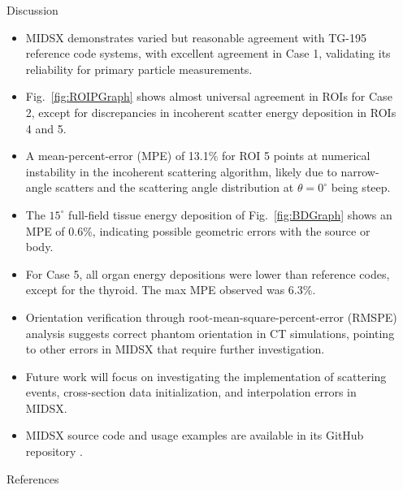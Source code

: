 \documentclass[final]{beamer}
\newlength{\sepwidth}
\newlength{\colwidth}
\newcommand{\separatorcolumn}{\begin{column}{\sepwidth}\end{column}}
\begin{document}
\begin{frame}[t]
\begin{columns}[t]
\begin{column}{\colwidth}
\begin{block}{Discussion}
  \begin{itemize}
      \item MIDSX demonstrates varied but reasonable agreement with TG-195 reference code systems, with excellent agreement in Case 1, validating its reliability for primary particle measurements.
      \item Fig.~\ref{fig:ROIPGraph} shows almost universal agreement in ROIs for Case 2, except for discrepancies in incoherent scatter energy deposition in ROIs 4 and 5.
      \item A mean-percent-error (MPE) of 13.1\% for ROI 5 points at numerical instability in the incoherent scattering algorithm, likely due to narrow-angle scatters and the scattering angle distribution at $\theta = 0^\circ$ being steep.
      \item The $15^\circ$ full-field tissue energy deposition of Fig.~\ref{fig:BDGraph} shows an MPE of 0.6\%, indicating possible geometric errors with the source or body.
      \item For Case 5, all organ energy depositions were lower than reference codes, except for the thyroid. The max MPE observed was 6.3\%.
      \item Orientation verification through root-mean-square-percent-error (RMSPE) analysis suggests correct phantom orientation in CT simulations, pointing to other errors in MIDSX that require further investigation.
      \item Future work will focus on investigating the implementation of scattering events, cross-section data initialization, and interpolation errors in MIDSX.
      \item MIDSX source code and usage examples are available in its GitHub repository \cite{MIDSX2023}.
  \end{itemize}
    
  \end{block}

  \begin{block}{References}

    \footnotesize{}

  \end{block}

\end{column}

\separatorcolumn
\end{columns}
\end{frame}
\end{document}

